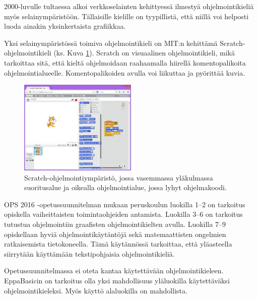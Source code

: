 2000-luvulle tultaessa alkoi
verkkoselainten kehittyessä
ilmestyä ohjelmointikieliä
myös selainympäristöön.
Tällaisille kielille on tyypillistä,
että niillä voi helposti luoda
ainakin yksinkertaista grafiikkaa.

Yksi selainympäristössä toimiva
ohjelmointikieli on
MIT:n kehittämä
Scratch-ohjelmoin\-ti\-kieli
\cite{scratch}
(ks. Kuva \ref{img:scratch}).
Scratch on visuaalinen ohjelmointikieli,
mikä tarkoittaa sitä, että
kieltä ohjelmoidaan raahaamalla
hiirellä komentopalikoita
ohjelmointialueelle.
Komentopalikoiden avulla
voi liikuttaa ja pyörittää
kuvia.

\begin{figure}[h]
    \centering
    \includegraphics[width=0.5\textwidth]{scratch}
    \caption{Scratch-ohjelmointiympäristö, jossa vasemmassa yläkulmassa suoritusalue ja oikealla ohjelmointialue, jossa lyhyt ohjelmakoodi.}
    \label{img:scratch}
\end{figure}

OPS 2016 -opetussuunnitelman
mukaan peruskoulun luokilla
1--2 on tarkoitus opiskella
vaiheittaisten toimintaohjeiden
antamista.
Luokilla 3--6 on tarkoitus
tutustua ohjelmointiin
graafisten ohjelmointikielten
avulla.
Luokilla 7--9 opiskellaan
hyviä ohjelmointikäytäntöjä
sekä matemaattisten ongelmien
ratkaisemista tietokoneella.
\cite{OPS_2016}
Tämä käytännössä tarkoittaa,
että yläasteella siirrytään
käyttämään tekstipohjaisia
ohjelmointikieliä.

Opetussuunnitelmassa ei
oteta kantaa käytettävään
ohjelmointikieleen.
EppaBasicin on tarkoitus olla
yksi mahdollisuus yläluokilla
käytettäväksi ohjelmointikieleksi.
Myös käyttö alaluokilla on
mahdollista.